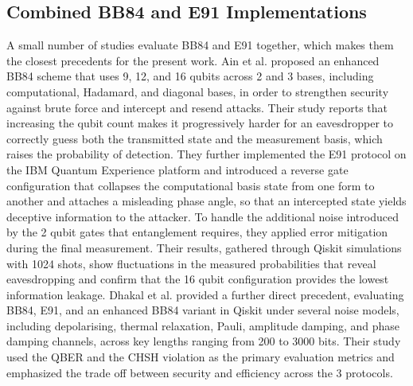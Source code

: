 \documentclass[conference]{IEEEtran}
\begin{document}
\subsection{Combined BB84 and E91 Implementations}
A small number of studies evaluate BB84 and E91 together, which makes them the
closest precedents for the present work. Ain et al. \cite{ain2025novel}
proposed an enhanced BB84 scheme that uses 9, 12, and 16 qubits
across 2 and 3 bases, including computational, Hadamard, and diagonal
bases, in order to strengthen security against brute force and intercept and
resend attacks. Their study reports that increasing the qubit count makes it
progressively harder for an eavesdropper to correctly guess both the
transmitted state and the measurement basis, which raises the probability of
detection. They further implemented the E91 protocol on the IBM Quantum
Experience platform and introduced a reverse gate configuration that collapses
the computational basis state from one form to another and attaches a
misleading phase angle, so that an intercepted state yields deceptive
information to the attacker. To handle the additional noise introduced by the
2 qubit gates that entanglement requires, they applied error mitigation
during the final measurement. Their results, gathered through Qiskit
simulations with 1024 shots, show fluctuations in the
measured probabilities that reveal eavesdropping and confirm that the 16
qubit configuration provides the lowest information leakage. Dhakal et al.
\cite{dhakal2025performance} provided a further direct precedent, evaluating
BB84, E91, and an enhanced BB84 variant in Qiskit under several noise models,
including depolarising, thermal relaxation, Pauli, amplitude damping, and phase
damping channels, across key lengths ranging from 200 to 3000
bits. Their study used the QBER and the CHSH violation as the primary
evaluation metrics and emphasized the trade off between security and efficiency
across the 3 protocols.
\end{document}
